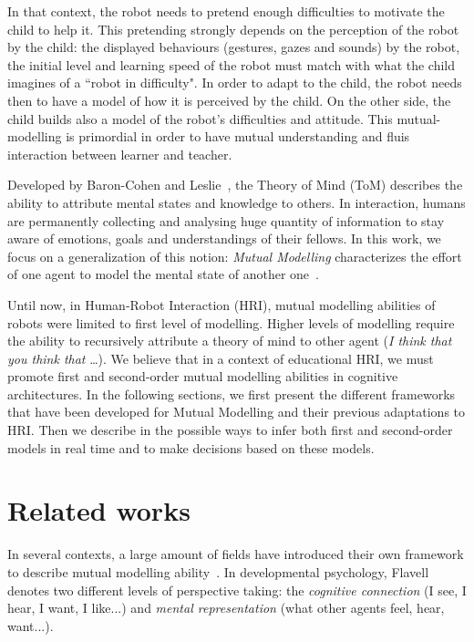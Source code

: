 \documentclass[conference]{IEEEtran}
\begin{document}
In that context, the robot needs to pretend enough difficulties to motivate the child to help it. 
This pretending strongly depends on the perception of the robot by the child: the displayed behaviours (gestures, gazes and sounds) by the robot, the initial level and learning speed of the robot must match with what the child imagines of a ``robot in difficulty".
In order to adapt to the child, the robot needs then to have a model of how it is perceived by the child. On the other side, the child builds also a model of the robot's difficulties and attitude. 
This mutual-modelling is primordial in order to have mutual understanding and fluis interaction between learner and teacher. 


Developed by Baron-Cohen and Leslie~\cite{baron1985does}, the Theory of Mind (ToM) describes the ability to attribute mental states and knowledge to others. 
In interaction, humans are permanently collecting and analysing huge quantity of information to stay aware of emotions, goals and understandings of their fellows. 
In this work, we focus on a generalization of this notion: \emph{Mutual Modelling} characterizes the effort of one agent to model the mental state of another one~\cite{dillenbourg1999you}. 

Until now, in Human-Robot Interaction (HRI), mutual modelling abilities of robots were limited to first level of modelling. 
Higher levels of modelling require the ability to recursively attribute a theory of mind to other agent (\textit{I think that you think that} \dots).  
We believe that in a context of educational HRI, we must promote first and second-order mutual modelling abilities in cognitive architectures. In the following sections, we first present the different frameworks that have been developed for Mutual Modelling and their previous adaptations to HRI. Then we describe in the possible ways to infer both first and second-order models in real time and to make decisions based on these models. 

\section{Related works}

In several contexts, a large amount of fields have introduced their own framework to describe mutual modelling ability~\cite{lemaignan2015mutual}. 
In developmental psychology, Flavell~\cite{flavell1990developmental} denotes two different levels of perspective taking: the \textit{cognitive connection} (I see, I hear, I want, I like...) and \textit{mental representation} (what other agents feel, hear, want...).
\end{document}

